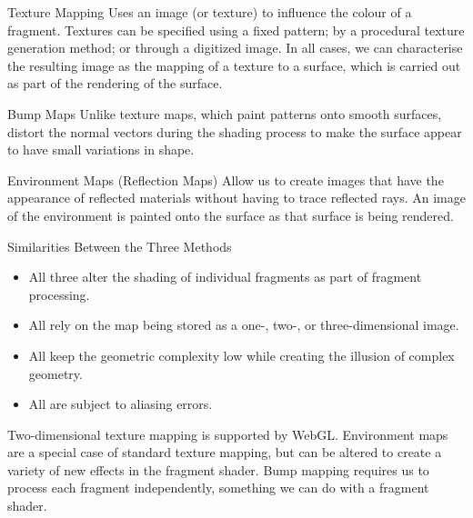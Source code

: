 \documentclass[../COS3712_Notes.tex]{subfiles}
\begin{document}
      \begin{definition}{Texture Mapping}
        Uses an image (or texture) to influence the colour of a fragment.
        Textures can be specified using a fixed pattern; by a procedural texture generation
        method; or through a digitized image.
        In all cases, we can characterise the resulting image as the mapping of a texture
        to a surface, which is carried out as part of the rendering of the surface.
      \end{definition}

      \begin{definition}{Bump Maps}
        Unlike texture maps, which paint patterns onto smooth surfaces,
         distort the normal vectors during the shading process to make the
        surface appear to have small variations in shape.
      \end{definition}

      \begin{definition}{Environment Maps (Reflection Maps)}
        Allow us to create images that have the appearance of reflected materials
        without having to trace reflected rays.
        An image of the environment is painted onto the surface as that surface is being
        rendered.
      \end{definition}

      \begin{sidenote}{Similarities Between the Three Methods}
        $ $\vspace{-1em}
        \begin{itemize}[nosep]
          \item All three alter the shading of individual fragments as part of fragment processing.
          \item All rely on the map being stored as a one-, two-, or three-dimensional image.
          \item All keep the geometric complexity low while creating the illusion of complex
            geometry.
          \item All are subject to aliasing errors.
        \end{itemize}
      \end{sidenote}

      Two-dimensional texture mapping is supported by WebGL.
      Environment maps are a special case of standard texture mapping, but can be altered
      to create a variety of new effects in the fragment shader.
      Bump mapping requires us to process each fragment independently,
      something we can do with a fragment shader.
\end{document}
